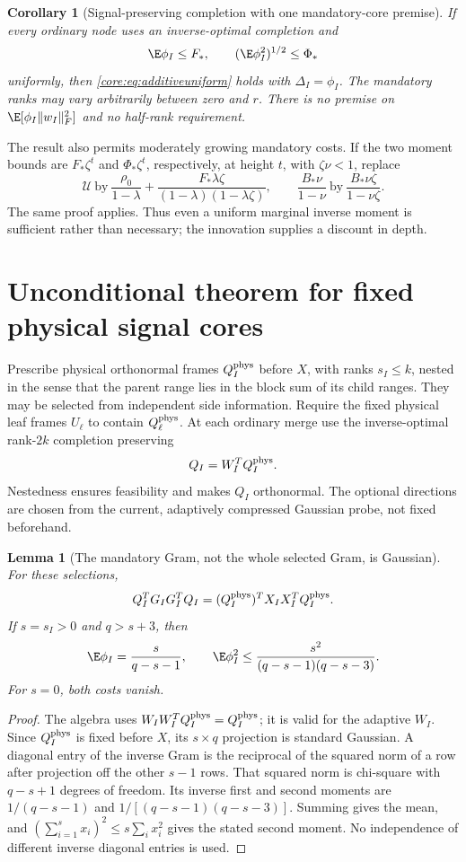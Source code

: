 \documentclass[11pt,oneside,openany,a4paper]{book}
\numberwithin{equation}{chapter}
\newtheorem{lemma}[theorem]{Lemma}
\newtheorem{corollary}[theorem]{Corollary}
\theoremstyle{definition}
\theoremstyle{remark}
\begin{document}
\begin{corollary}[Signal-preserving completion with one mandatory-core premise]\label{core:cor:core}
If every ordinary node uses an inverse-optimal completion and
\[
 \E\phi_I\le F_*,\qquad (\E\phi_I^2)^{1/2}\le\Phi_*
\]
uniformly, then \eqref{core:eq:additiveuniform} holds with $\Delta_I=\phi_I$. The mandatory ranks may vary arbitrarily between zero and $r$. There is no premise on $\E[\phi_I\|w_I\|_F^2]$ and no half-rank requirement.
\end{corollary}

The result also permits moderately growing mandatory costs. If the two moment bounds are $F_*\zeta^t$ and $\Phi_*\zeta^t$, respectively, at height $t$, with $\zeta\nu<1$, replace
\[
 \mathcal U\ \text{by}\ 
 \frac{\rho_0}{1-\lambda}+\frac{F_*\lambda\zeta}{(1-\lambda)(1-\lambda\zeta)},
 \qquad
 \frac{B_*\nu}{1-\nu}\ \text{by}\ \frac{B_*\nu\zeta}{1-\nu\zeta}.
\]
The same proof applies. Thus even a uniform marginal inverse moment is sufficient rather than necessary; the innovation supplies a discount in depth.

\section{Unconditional theorem for fixed physical signal cores}\label{core:sec:anchored}
Prescribe physical orthonormal frames $Q_I^{\rm phys}$ before $X$, with ranks $s_I\le k$, nested in the sense that the parent range lies in the block sum of its child ranges. They may be selected from independent side information. Require the fixed physical leaf frames $U_\ell$ to contain $Q_\ell^{\rm phys}$. At each ordinary merge use the inverse-optimal rank-$2k$ completion preserving
\[
 Q_I=W_I^TQ_I^{\rm phys}.
\]
Nestedness ensures feasibility and makes $Q_I$ orthonormal. The optional directions are chosen from the current, adaptively compressed Gaussian probe, not fixed beforehand.

\begin{lemma}[The mandatory Gram, not the whole selected Gram, is Gaussian]\label{core:lem:coregauss}
For these selections,
\[
 Q_I^TG_IG_I^TQ_I=(Q_I^{\rm phys})^TX_IX_I^TQ_I^{\rm phys}.
\]
If $s=s_I>0$ and $q>s+3$, then
\begin{equation}\label{core:eq:coregaussian}
 \E\phi_I=\frac{s}{q-s-1},\qquad
 \E\phi_I^2\le\frac{s^2}{(q-s-1)(q-s-3)}.
\end{equation}
For $s=0$, both costs vanish.
\end{lemma}
\begin{proof}
The algebra uses $W_IW_I^TQ_I^{\rm phys}=Q_I^{\rm phys}$; it is valid for the adaptive $W_I$. Since $Q_I^{\rm phys}$ is fixed before $X$, its $s\times q$ projection is standard Gaussian. A diagonal entry of the inverse Gram is the reciprocal of the squared norm of a row after projection off the other $s-1$ rows. That squared norm is chi-square with $q-s+1$ degrees of freedom. Its inverse first and second moments are $1/(q-s-1)$ and $1/[(q-s-1)(q-s-3)]$. Summing gives the mean, and $(\sum_{i=1}^s x_i)^2\le s\sum_i x_i^2$ gives the stated second moment. No independence of different inverse diagonal entries is used.
\end{proof}
\end{document}
